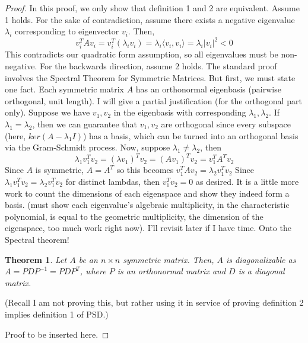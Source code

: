 \documentclass{article}
\newtheorem{theorem}{Theorem}[section]
\begin{document}
\begin{proof}
    In this proof, we only show that definition 1 and 2 are equivalent. \bigskip
    \newline
    Assume 1 holds. For the sake of contradiction, assume there exists a negative eigenvalue $\lambda_i$ corresponding to eigenvector $v_i$. Then, $$v_i^TAv_i = v_i^T(\lambda_iv_i) = \lambda_i \langle v_i, v_i\rangle = \lambda_i|v_i|^2 < 0$$
    This contradicts our quadratic form assumption, so all eigenvalues must be non-negative. \bigskip
    \newline
    For the backwards direction, assume 2 holds. The standard proof involves the Spectral Theorem for Symmetric Matrices. But first, we must state one fact. Each symmetric matrix $A$ has an orthonormal eigenbasis (pairwise orthogonal, unit length). 
    \newline
    \noindent I will give a partial justification (for the orthogonal part only). Suppose we have $v_1, v_2$ in the eigenbasis with corresponding $\lambda_1, \lambda_2$. If $\lambda_1 = \lambda_2$, then we can guarantee that $v_1, v_2$ are orthogonal since every subspace (here, $ker(A-\lambda_1 I)$) has a basis, which can be turned into an orthogonal basis via the Gram-Schmidt process. 
    Now, suppose $\lambda_1 \neq \lambda_2$, then 
    $$ \lambda_1v_1^Tv_2 = (\lambda v_1)^Tv_2 = (Av_1)^Tv_2 = v_1^TA^Tv_2$$
    Since $A$ is symmetric, $A = A^T$ so this becomes $v_1^TAv_2 = \lambda_2v_1^Tv_2$
    Since $\lambda_1v_1^Tv_2 = \lambda_2v_1^Tv_2$ for distinct lambdas, then $v_1^Tv_2 = 0$ as desired. It is a little more work to count the dimensions of each eigenspace  and show they indeed form a basis. (must show each eigenvalue's algebraic multiplicity, in the characteristic polynomial, is equal to the geometric multiplicity, the dimension of the eigenspace, too much work right now). I'll revisit later if I have time. 
    Onto the Spectral theorem! 
    
    \begin{theorem}
        Let $A$ be an $n \times n$ symmetric matrix. Then, $A$ is diagonalizable as 
        $A = PDP^{-1} = PDP^T$, where $P$ is an orthonormal matrix and $D$ is a diagonal matrix.  
    \end{theorem}
    \noindent (Recall I am not proving this, but rather using it in service of proving definition 2 implies definition 1 of PSD.)

    Proof to be inserted here. 
    
\end{proof}
\end{document}
